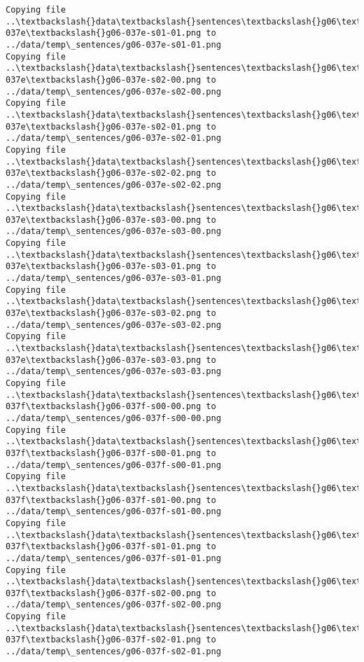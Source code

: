 \documentclass[11pt]{article}
\begin{document}
\begin{Verbatim}[commandchars=\\\{\}]
Copying file ..\textbackslash{}data\textbackslash{}sentences\textbackslash{}g06\textbackslash{}g06-037e\textbackslash{}g06-037e-s01-01.png to
../data/temp\_sentences/g06-037e-s01-01.png
Copying file ..\textbackslash{}data\textbackslash{}sentences\textbackslash{}g06\textbackslash{}g06-037e\textbackslash{}g06-037e-s02-00.png to
../data/temp\_sentences/g06-037e-s02-00.png
Copying file ..\textbackslash{}data\textbackslash{}sentences\textbackslash{}g06\textbackslash{}g06-037e\textbackslash{}g06-037e-s02-01.png to
../data/temp\_sentences/g06-037e-s02-01.png
Copying file ..\textbackslash{}data\textbackslash{}sentences\textbackslash{}g06\textbackslash{}g06-037e\textbackslash{}g06-037e-s02-02.png to
../data/temp\_sentences/g06-037e-s02-02.png
Copying file ..\textbackslash{}data\textbackslash{}sentences\textbackslash{}g06\textbackslash{}g06-037e\textbackslash{}g06-037e-s03-00.png to
../data/temp\_sentences/g06-037e-s03-00.png
Copying file ..\textbackslash{}data\textbackslash{}sentences\textbackslash{}g06\textbackslash{}g06-037e\textbackslash{}g06-037e-s03-01.png to
../data/temp\_sentences/g06-037e-s03-01.png
Copying file ..\textbackslash{}data\textbackslash{}sentences\textbackslash{}g06\textbackslash{}g06-037e\textbackslash{}g06-037e-s03-02.png to
../data/temp\_sentences/g06-037e-s03-02.png
Copying file ..\textbackslash{}data\textbackslash{}sentences\textbackslash{}g06\textbackslash{}g06-037e\textbackslash{}g06-037e-s03-03.png to
../data/temp\_sentences/g06-037e-s03-03.png
Copying file ..\textbackslash{}data\textbackslash{}sentences\textbackslash{}g06\textbackslash{}g06-037f\textbackslash{}g06-037f-s00-00.png to
../data/temp\_sentences/g06-037f-s00-00.png
Copying file ..\textbackslash{}data\textbackslash{}sentences\textbackslash{}g06\textbackslash{}g06-037f\textbackslash{}g06-037f-s00-01.png to
../data/temp\_sentences/g06-037f-s00-01.png
Copying file ..\textbackslash{}data\textbackslash{}sentences\textbackslash{}g06\textbackslash{}g06-037f\textbackslash{}g06-037f-s01-00.png to
../data/temp\_sentences/g06-037f-s01-00.png
Copying file ..\textbackslash{}data\textbackslash{}sentences\textbackslash{}g06\textbackslash{}g06-037f\textbackslash{}g06-037f-s01-01.png to
../data/temp\_sentences/g06-037f-s01-01.png
Copying file ..\textbackslash{}data\textbackslash{}sentences\textbackslash{}g06\textbackslash{}g06-037f\textbackslash{}g06-037f-s02-00.png to
../data/temp\_sentences/g06-037f-s02-00.png
Copying file ..\textbackslash{}data\textbackslash{}sentences\textbackslash{}g06\textbackslash{}g06-037f\textbackslash{}g06-037f-s02-01.png to
../data/temp\_sentences/g06-037f-s02-01.png

\end{Verbatim}
\end{document}
